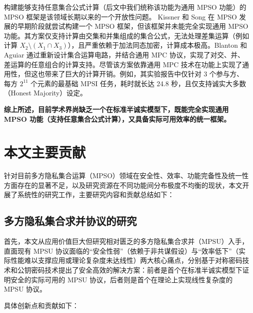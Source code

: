 构建能够支持任意集合公式计算（后文中我们统称该功能为通用 MPSO 功能）的 MPSO 框架是该领域长期以来的一个开放性问题。
Kissner 和 Song \cite{KS-CRYPTO-2005} 在 MPSO 发展的早期阶段就尝试构建一个 MPSO 框架，但该框架并未能完全实现通用 MPSO 功能。其方案仅支持计算由交集和并集组成的集合公式，无法处理差集运算（例如计算 $X_2 \setminus (X_1 \cap X_3)$），且严重依赖于加法同态加密，计算成本极高。Blanton 和 Aguiar \cite{BA-ASIACCS-2012} 通过重新设计集合运算电路，并结合通用 MPC 协议，实现了对交、并、差运算的任意组合的计算支持。尽管该方案依靠通用 MPC 技术在功能上实现了通用性，但这也带来了巨大的计算开销。例如，其实验报告中仅针对 3 个参与方、每方 $2^{11}$ 个元素的最基础 MPSI 任务，耗时就长达 24.8 秒，且仅支持诚实大多数（Honest Majority）设定。

\par\vspace{1em}
\textbf{综上所述，目前学术界尚缺乏一个在标准半诚实模型下，既能完全实现通用 MPSO 功能（支持任意集合公式计算），又具备实际可用效率的统一框架。}

\section{本文主要贡献}

针对目前多方隐私集合运算（MPSO）领域在安全性、效率、功能完备性及统一性方面存在的显著不足，以及研究资源在不同功能间分布极度不均衡的现状，本文开展了系统性的研究工作，主要研究内容和贡献总结如下：

\subsection{多方隐私集合求并协议的研究}

首先，本文从应用价值巨大但研究相对匮乏的多方隐私集合求并（MPSU）入手，直面现有 MPSU 协议面临的“安全性弱”（依赖于非共谋假设）与“效率低下”（实际性能难以支撑应用或理论复杂度未达线性）两大核心痛点，分别基于对称密码技术和公钥密码技术提出了安全高效的解决方案：前者是首个在标准半诚实模型下证明安全的实际可用的 MPSU 协议，后者则是首个在理论上实现线性复杂度的 MPSU 协议。

具体创新点和贡献如下：

